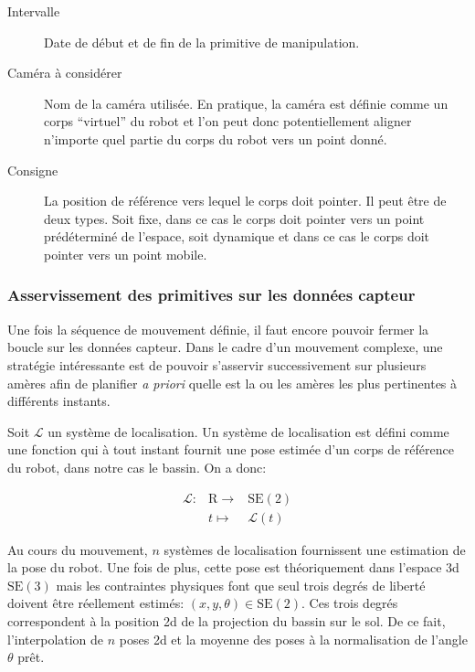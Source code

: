 \begin{description}
\item[Intervalle] Date de début et de fin de la primitive de manipulation.
\item[Caméra à considérer] Nom de la caméra utilisée. En pratique, la
  caméra est définie comme un corps ``virtuel'' du robot et l'on peut
  donc potentiellement aligner n'importe quel partie du corps du robot
  vers un point donné.
\item[Consigne] La position de référence vers lequel le corps doit
  pointer. Il peut être de deux types. Soit fixe, dans ce cas le corps
  doit pointer vers un point prédéterminé de l'espace, soit dynamique
  et dans ce cas le corps doit pointer vers un point mobile.
\end{description}


\subsubsection{Asservissement des primitives sur les données capteur}


Une fois la séquence de mouvement définie, il faut encore pouvoir
fermer la boucle sur les données capteur. Dans le cadre d'un mouvement
complexe, une stratégie intéressante est de pouvoir s'asservir
successivement sur plusieurs amères afin de planifier \emph{a priori}
quelle est la ou les amères les plus pertinentes à différents instants.


Soit $\mathcal{L}$ un système de localisation. Un système de
localisation est défini comme une fonction qui à tout instant fournit
une pose estimée d'un corps de référence du robot, dans notre cas le
bassin. On a donc:

\begin{equation}
  \begin{array}{ccc}
    \mathcal{L} : & \mathrm{R} \rightarrow & \text{SE}(2)\\
    ~ & t \mapsto & \mathcal{L}(t)
  \end{array}
\end{equation}

Au cours du mouvement, $n$ systèmes de localisation fournissent une
estimation de la pose du robot. Une fois de plus, cette pose est
théoriquement dans l'espace 3d $\text{SE}(3)$ mais les contraintes
physiques font que seul trois degrés de liberté doivent être
réellement estimés: $(x, y, \theta) \in \text{SE}(2)$. Ces trois
degrés correspondent à la position 2d de la projection du bassin sur
le sol. De ce fait, l'interpolation de $n$ poses 2d et la moyenne des
poses à la normalisation de l'angle $\theta$ prêt.


